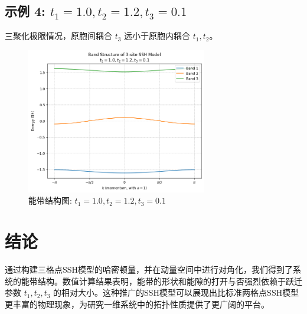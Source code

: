 \documentclass[UTF-8]{ctexart}
\begin{document}
\subsection{示例 4: $t_1=1.0, t_2=1.2, t_3=0.1$}
三聚化极限情况，原胞间耦合 $t_3$ 远小于原胞内耦合 $t_1, t_2$。
\begin{figure}[H]
    \centering
    \includegraphics[width=0.7\textwidth]{band_structure_t1_1.0_t2_1.2_t3_0.1_ex4.png}
    \caption{能带结构图: $t_1=1.0, t_2=1.2, t_3=0.1$}
    \label{fig:band4}
\end{figure}

\clearpage
\section{结论}
通过构建三格点SSH模型的哈密顿量，并在动量空间中进行对角化，我们得到了系统的能带结构。数值计算结果表明，能带的形状和能隙的打开与否强烈依赖于跃迁参数 $t_1, t_2, t_3$ 的相对大小。这种推广的SSH模型可以展现出比标准两格点SSH模型更丰富的物理现象，为研究一维系统中的拓扑性质提供了更广阔的平台。
\end{document}
